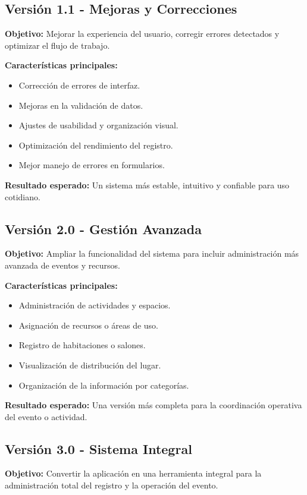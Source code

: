 \documentclass[11pt,a4paper]{article}
\begin{document}
\subsection{Versión 1.1 - Mejoras y Correcciones}
\textbf{Objetivo:}\newline
Mejorar la experiencia del usuario, corregir errores detectados y optimizar el flujo de trabajo.

\textbf{Características principales:}
\begin{itemize}[leftmargin=1.5em]
    \item Corrección de errores de interfaz.
    \item Mejoras en la validación de datos.
    \item Ajustes de usabilidad y organización visual.
    \item Optimización del rendimiento del registro.
    \item Mejor manejo de errores en formularios.
\end{itemize}

\textbf{Resultado esperado:}\newline
Un sistema más estable, intuitivo y confiable para uso cotidiano.

\subsection{Versión 2.0 - Gestión Avanzada}
\textbf{Objetivo:}\newline
Ampliar la funcionalidad del sistema para incluir administración más avanzada de eventos y recursos.

\textbf{Características principales:}
\begin{itemize}[leftmargin=1.5em]
    \item Administración de actividades y espacios.
    \item Asignación de recursos o áreas de uso.
    \item Registro de habitaciones o salones.
    \item Visualización de distribución del lugar.
    \item Organización de la información por categorías.
\end{itemize}

\textbf{Resultado esperado:}\newline
Una versión más completa para la coordinación operativa del evento o actividad.

\subsection{Versión 3.0 - Sistema Integral}
\textbf{Objetivo:}\newline
Convertir la aplicación en una herramienta integral para la administración total del registro y la operación del evento.
\end{document}
